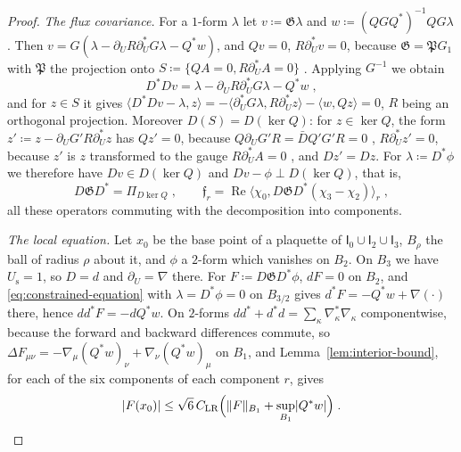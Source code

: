 \documentclass[11pt]{preprint}
\DeclarePairedDelimiter{\abs}{\lvert}{\rvert}
\DeclarePairedDelimiter{\norm}{\lVert}{\rVert}
\numberwithin{equation}{section}
\theoremstyle{definition}
\theoremstyle{remark}
\theoremstyle{plain}
\begin{document}
\begin{proof}
\emph{The flux covariance.} For a $1$-form $\lambda$ let $v \coloneqq \mathfrak G\lambda$ and $w \coloneqq (QGQ^*)^{-1}QG\lambda$. Then $v = G(\lambda - \partial_UR\partial_U^*G\lambda - Q^*w)$, and $Qv = 0$, $R\partial_U^*v = 0$, because $\mathfrak G = \mathfrak PG_1$ with $\mathfrak P$ the projection onto $S \coloneqq \{ QA = 0, R\partial_U^*A = 0 \}$ \cite[(3.153); p.~425]{BalabanPBG}. Applying $G^{-1}$ we obtain
\begin{equation}\label{eq:constrained-equation}
    D^*Dv = \lambda - \partial_UR\partial_U^*G\lambda - Q^*w\;,
\end{equation}
and for $z \in S$ it gives $\langle D^*Dv - \lambda, z\rangle = -\langle\partial_U^*G\lambda, R\partial_U^*z\rangle - \langle w, Qz\rangle = 0$, $R$ being an orthogonal projection. Moreover $D(S) = D(\ker Q)$: for $z \in \ker Q$, the form $z' \coloneqq z - \partial_UG'R\partial_U^*z$ has $Qz' = 0$, because $Q\partial_UG'R = \bar DQ'G'R = 0$ \cite[p.~426, l.~17]{BalabanPBG}, $R\partial_U^*z' = 0$, because $z'$ is $z$ transformed to the gauge $R\partial_U^*A = 0$ \cite[p.~419, ll.~26--27]{BalabanPBG}, and $Dz' = Dz$. For $\lambda \coloneqq D^*\phi$ we therefore have $Dv \in D(\ker Q)$ and $Dv - \phi \perp D(\ker Q)$, that is,
\begin{equation}\label{eq:constrained-flux}
    D\mathfrak GD^* = \Pi_{D\ker Q}\;,
    \qquad
    \mathfrak f_r = \operatorname{Re}\bigl\langle\chi_0, D\mathfrak GD^*(\chi_3 - \chi_2)\bigr\rangle_r\;,
\end{equation}
all these operators commuting with the decomposition into components.

\emph{The local equation.} Let $x_0$ be the base point of a plaquette of $\mathsf I_0 \cup \mathsf I_2 \cup \mathsf I_3$, $B_\rho$ the ball of radius $\rho$ about it, and $\phi$ a $2$-form which vanishes on $B_2$. On $B_3$ we have $U_{\mathrm s} = 1$, so $D = d$ and $\partial_U = \nabla$ there. For $F \coloneqq D\mathfrak GD^*\phi$, $dF = 0$ on $B_2$, and \eqref{eq:constrained-equation} with $\lambda = D^*\phi = 0$ on $B_{3/2}$ gives $d^*F = -Q^*w + \nabla(\cdot)$ there, hence $dd^*F = -dQ^*w$. On $2$-forms $dd^* + d^*d = \sum_\kappa\nabla_\kappa^*\nabla_\kappa$ componentwise, because the forward and backward differences commute, so $\Delta F_{\mu\nu} = -\nabla_\mu(Q^*w)_\nu + \nabla_\nu(Q^*w)_\mu$ on $B_1$, and Lemma~\ref{lem:interior-bound}, for each of the six components of each component $r$, gives
\begin{equation}\label{eq:local-flux-bound}
    \abs{F(x_0)} \leq \sqrt6\,C_{\mathrm{LR}}\Bigl(\norm F_{B_1} + \sup_{B_1}\abs{Q^*w}\Bigr)\;.
\end{equation}


\end{proof}
\end{document}
